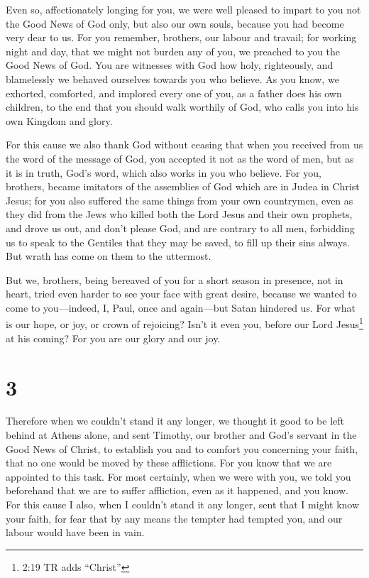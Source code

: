  Even so, affectionately longing for you, we were well
pleased to impart to you not the Good News of God only, but also our own
souls, because you had become very dear to us.  For you
remember, brothers, our labour and travail; for working night and day,
that we might not burden any of you, we preached to you the Good News of
God.  You are witnesses with God how holy, righteously, and
blamelessly we behaved ourselves towards you who believe. 
As you know, we exhorted, comforted, and implored every one of you, as a
father does his own children,  to the end that you should
walk worthily of God, who calls you into his own Kingdom and glory.

 For this cause we also thank God without ceasing that when
you received from us the word of the message of God, you accepted it not
as the word of men, but as it is in truth, God's word, which also works
in you who believe.  For you, brothers, became imitators of
the assemblies of God which are in Judea in Christ Jesus; for you also
suffered the same things from your own countrymen, even as they did from
the Jews  who killed both the Lord Jesus and their own
prophets, and drove us out, and don't please God, and are contrary to
all men,  forbidding us to speak to the Gentiles that they
may be saved, to fill up their sins always. But wrath has come on them
to the uttermost.

 But we, brothers, being bereaved of you for a short season
in presence, not in heart, tried even harder to see your face with great
desire,  because we wanted to come to you---indeed, I,
Paul, once and again---but Satan hindered us.  For what is
our hope, or joy, or crown of rejoicing? Isn't it even you, before our
Lord Jesus\footnote{2:19 TR adds ``Christ''} at his coming?
 For you are our glory and our joy.

\hypertarget{section-2}{%
\section{3}\label{section-2}}

 Therefore when we couldn't stand it any longer, we thought
it good to be left behind at Athens alone,  and sent
Timothy, our brother and God's servant in the Good News of Christ, to
establish you and to comfort you concerning your faith, 
that no one would be moved by these afflictions. For you know that we
are appointed to this task.  For most certainly, when we
were with you, we told you beforehand that we are to suffer affliction,
even as it happened, and you know.  For this cause I also,
when I couldn't stand it any longer, sent that I might know your faith,
for fear that by any means the tempter had tempted you, and our labour
would have been in vain.

